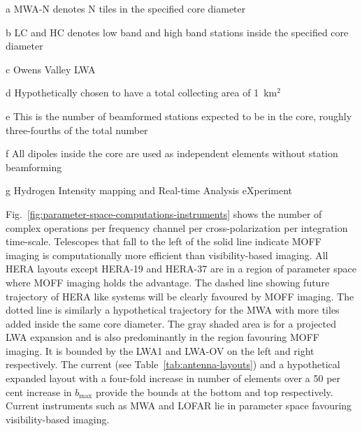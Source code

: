 \documentclass[a4paper,fleqn,usenatbib]{mnras}
\begin{document}
\begin{table}
\begin{threeparttable}
  \begin{tablenotes}
    \item[a] MWA-N denotes N tiles in the specified core diameter
    \item[b] LC and HC denotes low band and high band stations inside the 
      specified core diameter 
    \item[c] Owens Valley LWA
    \item[d] Hypothetically chosen to have a total collecting area of 
      1~km$^2$
    \item[e] This is the number of beamformed stations expected to be in the 
      core, roughly three-fourths of the total number
    \item[f] All dipoles inside the core are used as independent elements 
      without station beamforming
    \item[g] Hydrogen Intensity mapping and Real-time Analysis eXperiment
  \end{tablenotes}
  \end{threeparttable}
\end{table}

Fig.~\ref{fig:parameter-space-computations-instruments} shows the number of 
complex operations per frequency channel per cross-polarization per integration 
time-scale. Telescopes that fall to the left of the solid line indicate MOFF 
imaging is computationally more efficient than visibility-based imaging. All HERA 
layouts except HERA-19 and HERA-37 are in a region of parameter space 
where MOFF imaging holds the advantage. The dashed line showing future trajectory 
of HERA like systems will be clearly favoured by MOFF imaging. The dotted line is 
similarly a hypothetical trajectory for the MWA with more tiles added inside the 
same core diameter. The gray shaded area is for a projected LWA expansion and is 
also predominantly in the region favouring MOFF imaging. It is bounded by the LWA1 
and LWA-OV on the left and right respectively. The current (see 
Table~\ref{tab:antenna-layouts}) and a hypothetical expanded layout with a 
four-fold increase in number of elements over a 50 per cent increase in 
$b_\textrm{max}$ provide the bounds at the bottom and top respectively. Current 
instruments such as MWA and LOFAR lie in parameter space favouring 
visibility-based imaging. 
\end{document}
